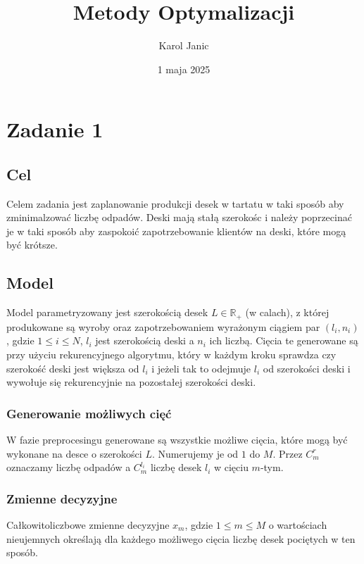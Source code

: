 \documentclass{article}
\title{Metody Optymalizacji}
\author{Karol Janic}
\date{1 maja 2025}
\begin{document}
\begin{titlingpage}
    \maketitle
\end{titlingpage}

\tableofcontents

\newpage

\section{Zadanie 1}
\subsection{Cel}
Celem zadania jest zaplanowanie produkcji desek w tartatu w taki sposób aby zminimalzować liczbę odpadów.
Deski mają stałą szerokośc i należy poprzecinać je w taki sposób aby zaspokoić zapotrzebowanie klientów na deski, które mogą być krótsze.

\subsection{Model}
Model parametryzowany jest szerokością desek $L \in \mathbb{R}_+$ (w calach), z której produkowane są wyroby oraz zapotrzebowaniem wyrażonym ciągiem par $(l_i, n_i)$, gdzie $1 \leq i \leq N$, $l_i$ jest szerokością deski a $n_i$ ich liczbą.
Cięcia te generowane są przy użyciu rekurencyjnego algorytmu, który w każdym kroku sprawdza czy szerokość deski jest większa od $l_i$ i jeżeli tak to odejmuje $l_i$ od szerokości deski i wywołuje się rekurencyjnie na pozostałej szerokości deski.

\subsubsection{Generowanie możliwych cięć}
W fazie preprocesingu generowane są wszystkie możliwe cięcia, które mogą być wykonane na desce o szerokości $L$.
Numerujemy je od $1$ do $M$. Przez $C_m^r$ oznaczamy liczbę odpadów a $C_m^{l_i}$ liczbę desek $l_i$ w cięciu $m$-tym.

\subsubsection{Zmienne decyzyjne}
Całkowitoliczbowe zmienne decyzyjne $x_m$, gdzie $1 \leq m \leq M$ o wartościach nieujemnych określają dla każdego możliwego cięcia liczbę desek pociętych w ten sposób.
\end{document}

